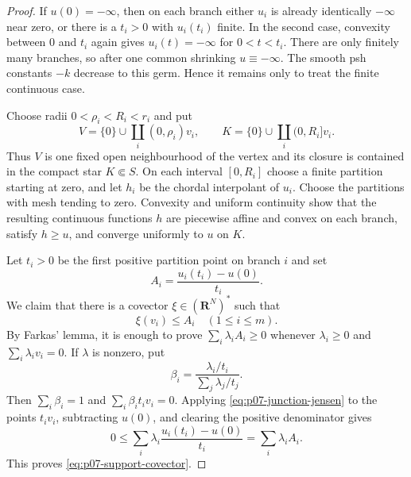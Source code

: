\begin{proof}
If $u(0)=-\infty$, then on each branch either $u_i$ is already
identically $-\infty$ near zero, or there is a $t_i>0$ with $u_i(t_i)$
finite.  In the second case, convexity between $0$ and $t_i$ again gives
$u_i(t)=-\infty$ for $0<t<t_i$.  There are only finitely many branches, so
after one common shrinking $u\equiv-\infty$.  The smooth psh constants
$-k$ decrease to this germ.  Hence it remains only to treat the finite
continuous case.

Choose radii $0<\rho_i<R_i<r_i$ and put
\[
 V=\{0\}\cup\coprod_i(0,\rho_i)v_i,
 \qquad
 K=\{0\}\cup\coprod_i(0,R_i]v_i.
\]
Thus $V$ is one fixed open neighbourhood of the vertex and its closure is
contained in the compact star $K\Subset S$.  On each interval $[0,R_i]$
choose a finite partition starting at zero, and let $h_i$ be the chordal
interpolant of $u_i$.  Choose the partitions with mesh tending to zero.
Convexity and uniform continuity show that the resulting continuous
functions $h$ are piecewise affine and convex on each branch, satisfy
$h\geq u$, and converge uniformly to $u$ on $K$.

Let $t_i>0$ be the first positive partition point on branch $i$ and set
\[
                   A_i=\frac{u_i(t_i)-u(0)}{t_i}.
\]
We claim that there is a covector $\xi\in(\mathbf R^N)^*$ such that
\begin{equation}
\label{eq:p07-support-covector}
                         \xi(v_i)\leq A_i
                         \quad(1\leq i\leq m).
\end{equation}
By Farkas' lemma, it is enough to prove
$\sum_i\lambda_iA_i\geq0$ whenever $\lambda_i\geq0$ and
$\sum_i\lambda_i v_i=0$.  If $\lambda$ is nonzero, put
\[
 \beta_i=
 \frac{\lambda_i/t_i}{\sum_j\lambda_j/t_j}.
\]
Then $\sum_i\beta_i=1$ and $\sum_i\beta_it_iv_i=0$.  Applying
\eqref{eq:p07-junction-jensen} to the points $t_iv_i$, subtracting $u(0)$,
and clearing the positive denominator gives
\[
                  0\leq\sum_i\lambda_i
                  \frac{u_i(t_i)-u(0)}{t_i}
                  =\sum_i\lambda_iA_i.
\]
This proves \eqref{eq:p07-support-covector}.


\end{proof}
